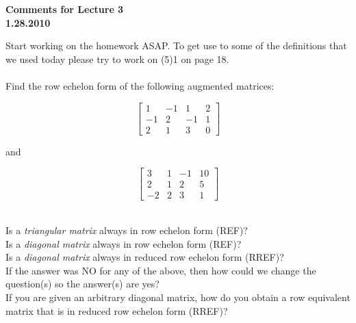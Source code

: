 \documentclass[12pt]{article}
\begin{document}
\begin{center}
{\large \bf Comments for Lecture 3}\\
\bf{1.28.2010}
\end{center}

Start working on the homework ASAP.  To get use to some of the definitions that we used today please try to work on (5)1 on page 18.\\

\\
Find the row echelon form of the following augmented matrices:

$$
\left[ \begin {array}{ccc|c} 1&-1&1&2\\ -1&2&-1&1
\\ 2&1&3&0\end {array} \right] 
$$

and

$$
\left[ \begin {array}{ccc|c} 3&1&-1&10\\ 2&1&2&5
\\ -2&2&3&1\end {array} \right]
$$

\\

\noindent Is a {\it triangular matrix} always in row echelon form (REF)?\\

\noindent Is a {\it diagonal matrix} always in row echelon form (REF)?\\

\noindent Is a {\it diagonal matrix} always in reduced row echelon form (RREF)?\\

\noindent If the answer was NO for any of the above, then how could we change the question(s) so the answer(s) are yes?\\

\noindent If you are given an arbitrary diagonal matrix, how do you obtain a row equivalent matrix that is in reduced row echelon form (RREF)?\\





\end{document}
